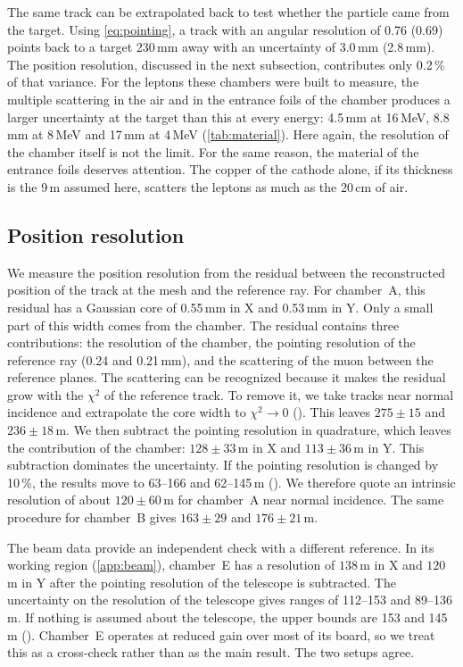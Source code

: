 The same track can be extrapolated back to test whether the particle came from the target. Using
\cref{eq:pointing}, a track with an angular resolution of 0.76\textdegree{} (0.69\textdegree) points back to a
target 230\,mm away with an uncertainty of 3.0\,mm (2.8\,mm). The position resolution, discussed in the next
subsection, contributes only 0.2\,\% of that variance. For the leptons these chambers were built to measure, the
multiple scattering in the air and in the entrance foils of the chamber produces a larger uncertainty at the target
than this at every energy: 4.5\,mm at 16\,MeV, 8.8\,mm at 8\,MeV and 17\,mm at 4\,MeV (\cref{tab:material}). Here
again, the resolution of the chamber itself is not the limit. For the same reason, the material of the entrance foils
deserves attention. The copper of the cathode alone, if its thickness is the 9\,\textmu m assumed here, scatters the
leptons as much as the 20\,cm of air.

\subsection{Position resolution}\label{sec:position}
We measure the position resolution from the residual between the reconstructed position of the track at the mesh
and the reference ray. For chamber~A, this residual has a Gaussian core of 0.55\,mm in X and 0.53\,mm in Y. Only a
small part of this width comes from the chamber. The residual contains three contributions: the resolution of the
chamber, the pointing resolution of the reference ray (0.24 and 0.21\,mm), and the scattering of the muon between the
reference planes. The scattering can be recognized because it makes the residual grow with the $\chi^2$ of the
reference track. To remove it, we take tracks near normal incidence and extrapolate the core width to $\chi^2\to0$
(). This leaves $275\pm15$ and $236\pm18$\,\textmu m. We then subtract the pointing resolution
in quadrature, which leaves the contribution of the chamber: $128\pm33$\,\textmu m in X and $113\pm36$\,\textmu m in
Y. This subtraction dominates the uncertainty. If the pointing resolution is changed by 10\,\%, the results move to
63--166 and 62--145\,\textmu m (). We therefore quote an intrinsic resolution of about
$120\pm60$\,\textmu m for chamber~A near normal incidence. The same procedure for chamber~B gives $163\pm29$ and
$176\pm21$\,\textmu m.

The beam data provide an independent check with a different reference. In its working region (\cref{app:beam}),
chamber~E has a resolution of $138$\,\textmu m in X and $120$\,\textmu m in Y after the pointing resolution of the
telescope is subtracted. The uncertainty on the resolution of the telescope gives ranges of 112--153 and
89--136\,\textmu m. If nothing is assumed about the telescope, the upper bounds are 153 and 145\,\textmu m
(). Chamber~E operates at reduced gain over most of its board, so we treat this as a
cross-check rather than as the main result. The two setups agree.

